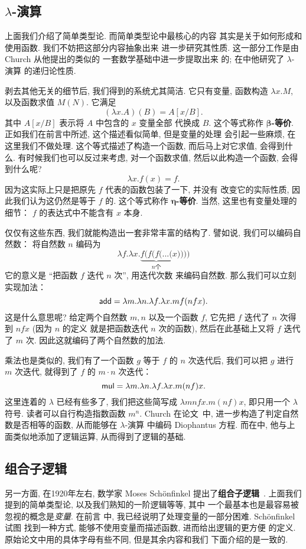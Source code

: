 \subsection{\texorpdfstring{\(\lambda\)}{Lambda}-演算}\label{beginning:lambda}
上面我们介绍了简单类型论. 而简单类型论中最核心的内容
其实是关于如何形成和使用函数. 我们不妨把这部分内容抽象出来
进一步研究其性质. 这一部分工作是由 Church 从他提出的类似的
一套数学基础\cite{church:1932:untyped}中进一步提取出来
的; 在\cite{church:1936:lambda}中他研究了 \(\lambda\)-演算
的递归论性质.

剥去其他无关的细节后, 我们得到的系统尤其简洁. 它只有变量,
函数构造 \(\lambda x. M\), 以及函数求值 \(M(N)\).
它满足
\[(\lambda x. A)(B) = A[x/B].\]
其中 \(A[x/B]\) 表示将 \(A\) 中包含的 \(x\) 变量全部
代换成 \(B\). 这个等式称作 \textbf{\(\boldsymbol\beta\)-等价}.
正如我们在前言中所述, 这个描述看似简单, 但是变量的处理
会引起一些麻烦, 在这里我们不做处理. 这个等式描述了构造一个函数,
而后马上对它求值, 会得到什么. 有时候我们也可以反过来考虑,
对一个函数求值, 然后以此构造一个函数, 会得到什么呢?
\[\lambda x. f(x) = f.\]
因为这实际上只是把原先 \(f\) 代表的函数包装了一下, 并没有
改变它的实际性质, 因此我们认为这仍然是等于 \(f\) 的.
这个等式称作 \textbf{\(\boldsymbol\eta\)-等价}.
当然, 这里也有变量处理的细节： \(f\) 的表达式中不能含有 \(x\) 本身.

仅仅有这些东西, 我们就能构造出一套非常丰富的结构了. 譬如说,
我们可以编码自然数： 将自然数 \(n\) 编码为
\[\lambda f. \lambda x. \underbrace{f(f(f(...(}_{n\text{个}}x))))\]
它的意义是 “把函数 \(f\) 迭代 \(n\) 次”, 用迭代次数
来编码自然数. 那么我们可以立刻实现加法：
\[\textsf{add} = \lambda m. \lambda n. \lambda f. \lambda x. mf(nfx).\]
这是什么意思呢? 给定两个自然数 \(m, n\) 以及一个函数 \(f\),
它先把 \(f\) 迭代了 \(n\) 次得到 \(nfx\) (因为 \(n\) 的定义
就是把函数迭代 \(n\) 次的函数), 然后在此基础上又将
\(f\) 迭代了 \(m\) 次. 因此这就编码了两个自然数的加法.

乘法也是类似的, 我们有了一个函数 \(g\) 等于 \(f\) 的 \(n\)
次迭代后, 我们可以把 \(g\) 进行 \(m\) 次迭代, 就得到了
\(f\) 的 \(m\cdot n\) 次迭代：
\[\textsf{mul} = \lambda m. \lambda n. \lambda f. \lambda x. m(nf)x.\]
这里连着的 \(\lambda\) 已经有些多了, 我们把这些简写成
\(\lambda mnfx. m(nf)x\), 即只用一个 \(\lambda\) 符号.
读者可以自行构造指数函数 \(m^n\). Church 在论文~\cite{church:1936:lambda}中,
进一步构造了判定自然数是否相等的函数, 从而能够在 \(\lambda\)-演算
中编码 Diophantus 方程. 而在\cite{church:1932:untyped}中,
他与上面类似地添加了逻辑运算, 从而得到了逻辑的基础.

\subsection{组合子逻辑}
另一方面, 在1920年左右, 数学家 Moses Sch\"onfinkel 提出了\textbf{组合子逻辑}~\cite{schonfinkel:1924:combinator}.
上面我们提到的简单类型论, 以及我们熟知的一阶逻辑等等, 其中
一个最基本也是最容易被忽视的概念是\emph{变量}. 在前言
中, 我已经说明了处理变量的一部分困难. Sch\"onfinkel 试图
找到一种方式, 能够不使用变量而描述函数, 进而给出逻辑的更方便
的定义. 原始论文中用的具体字母有些不同, 但是其余内容和我们
下面介绍的是一致的.

